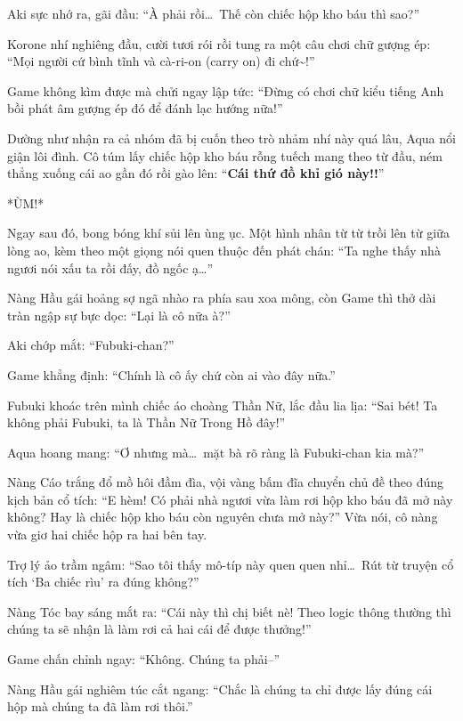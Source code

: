 \documentclass[../main.tex]{subfiles}
\begin{document}
Aki sực nhớ ra, gãi đầu: ``À phải rồi\dots\ Thế còn chiếc hộp kho báu thì sao?''

Korone nhí nghiêng đầu, cười tươi rói rồi tung ra một câu chơi chữ gượng ép: ``Mọi người cứ bình tĩnh và cà-ri-on (carry on) đi chứ\~{}!''

Game không kìm được mà chửi ngay lập tức: ``Đừng có chơi chữ kiểu tiếng Anh bồi phát âm gượng ép đó để đánh lạc hướng nữa!''

\ct

Dường như nhận ra cả nhóm đã bị cuốn theo trò nhảm nhí này quá lâu, Aqua nổi giận lôi đình. Cô túm lấy chiếc hộp kho báu rỗng tuếch mang theo từ đầu, ném thẳng xuống cái ao gần đó rồi gào lên: ``\textbf{Cái thứ đồ khỉ gió này!!}''

*ÙM!*

Ngay sau đó, bong bóng khí sủi lên ùng ục. Một hình nhân từ từ trồi lên từ giữa lòng ao, kèm theo một giọng nói quen thuộc đến phát chán: ``Ta nghe thấy nhà ngươi nói xấu ta rồi đấy, đồ ngốc ạ\dots''

Nàng Hầu gái hoảng sợ ngã nhào ra phía sau xoa mông, còn Game thì thở dài tràn ngập sự bực dọc: ``Lại là cô nữa à?''

Aki chớp mắt: ``Fubuki-chan?''

Game khẳng định: ``Chính là cô ấy chứ còn ai vào đây nữa.''


Fubuki khoác trên mình chiếc áo choàng Thần Nữ, lắc đầu lia lịa: ``Sai bét! Ta không phải Fubuki, ta là Thần Nữ Trong Hồ đây!''

Aqua hoang mang: ``Ơ nhưng mà\dots\ mặt bà rõ ràng là Fubuki-chan kia mà?''

Nàng Cáo trắng đổ mồ hôi đầm đìa, vội vàng bấm đĩa chuyển chủ đề theo đúng kịch bản cổ tích: ``E hèm! Có phải nhà ngươi vừa làm rơi hộp kho báu đã mở này không? Hay là chiếc hộp kho báu còn nguyên chưa mở này?'' Vừa nói, cô nàng vừa giơ hai chiếc hộp ra hai bên tay.

Trợ lý ảo trầm ngâm: ``Sao tôi thấy mô-típ này quen quen nhỉ\dots\ Rút từ truyện cổ tích `Ba chiếc rìu' ra đúng không?''

Nàng Tóc bay sáng mắt ra: ``Cái này thì chị biết nè! Theo logic thông thường thì chúng ta sẽ nhận là làm rơi cả hai cái để được thưởng!''

Game chấn chỉnh ngay: ``Không. Chúng ta phải--''

Nàng Hầu gái nghiêm túc cắt ngang: ``Chắc là chúng ta chỉ được lấy đúng cái hộp mà chúng ta đã làm rơi thôi.''
\end{document}
